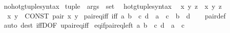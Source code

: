 \begin{isabellebody}
\isamarkupfalse%
\isanewline
{}\isamarkupfalse%
\ no{\isacharunderscore}{\kern0pt}hotg{\isacharunderscore}{\kern0pt}tuple{\isacharunderscore}{\kern0pt}syntax\isanewline
{}\isanewline
{}\isamarkupfalse%
\ {\isachardoublequoteopen}{\isacharunderscore}{\kern0pt}tuple{\isachardoublequoteclose}\ {\isacharcolon}{\kern0pt}{\isacharcolon}{\kern0pt}\ {\isacartoucheopen}args\ {\isasymRightarrow}\ set{\isacartoucheclose}\ {\isacharparenleft}{\kern0pt}{\isachardoublequoteopen}{\isasymlangle}{\isacharunderscore}{\kern0pt}{\isasymrangle}{\isachardoublequoteclose}{\isacharparenright}{\kern0pt}\isanewline
{}\isamarkupfalse%
\isanewline
{}\isamarkupfalse%
\ hotg{\isacharunderscore}{\kern0pt}tuple{\isacharunderscore}{\kern0pt}syntax\isanewline
\isanewline
{}\isamarkupfalse%
\isanewline
\ \ {\isachardoublequoteopen}{\isasymlangle}x{\isacharcomma}{\kern0pt}\ y{\isacharcomma}{\kern0pt}\ z{\isasymrangle}{\isachardoublequoteclose}\ {\isasymrightleftharpoons}\ {\isachardoublequoteopen}{\isasymlangle}x{\isacharcomma}{\kern0pt}\ {\isasymlangle}y{\isacharcomma}{\kern0pt}\ z{\isasymrangle}{\isasymrangle}{\isachardoublequoteclose}\isanewline
\ \ {\isachardoublequoteopen}{\isasymlangle}x{\isacharcomma}{\kern0pt}\ y{\isasymrangle}{\isachardoublequoteclose}\ {\isasymrightleftharpoons}\ {\isachardoublequoteopen}CONST\ pair\ x\ y{\isachardoublequoteclose}\isanewline
\isanewline
{}\isamarkupfalse%
\ pair{\isacharunderscore}{\kern0pt}eq{\isacharunderscore}{\kern0pt}iff\ {\isacharbrackleft}{\kern0pt}iff{\isacharbrackright}{\kern0pt}{\isacharcolon}{\kern0pt}\ {\isachardoublequoteopen}{\isasymlangle}a{\isacharcomma}{\kern0pt}\ b{\isasymrangle}\ {\isacharequal}{\kern0pt}\ {\isasymlangle}c{\isacharcomma}{\kern0pt}\ d{\isasymrangle}\ {\isasymlongleftrightarrow}\ a\ {\isacharequal}{\kern0pt}\ c\ {\isasymand}\ b\ {\isacharequal}{\kern0pt}\ d{\isachardoublequoteclose}\isanewline
%
\isadelimproof
\ \ %
\endisadelimproof
%
\isatagproof
{}\isamarkupfalse%
\ pair{\isacharunderscore}{\kern0pt}def\ \isamarkupfalse%
\ {\isacharparenleft}{\kern0pt}auto\ dest{\isacharcolon}{\kern0pt}\ iffD{}{\isacharbrackleft}{\kern0pt}OF\ upair{\isacharunderscore}{\kern0pt}eq{\isacharunderscore}{\kern0pt}iff{\isacharbrackright}{\kern0pt}{\isacharparenright}{\kern0pt}%
\endisatagproof
{\isafoldproof}%
%
\isadelimproof
\isanewline
%
\endisadelimproof
\isanewline
{}\isamarkupfalse%
\ eq{\isacharunderscore}{\kern0pt}if{\isacharunderscore}{\kern0pt}pair{\isacharunderscore}{\kern0pt}eq{\isacharunderscore}{\kern0pt}left{\isacharcolon}{\kern0pt}\ {\isachardoublequoteopen}{\isasymlangle}a{\isacharcomma}{\kern0pt}\ b{\isasymrangle}\ {\isacharequal}{\kern0pt}\ {\isasymlangle}c{\isacharcomma}{\kern0pt}\ d{\isasymrangle}\ {\isasymLongrightarrow}\ a\ {\isacharequal}{\kern0pt}\ c{\isachardoublequoteclose}%

\end{isabellebody}
